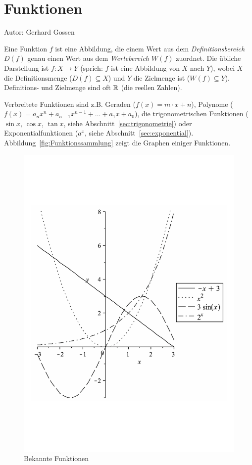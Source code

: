 \newcommand{\pitwo}{\frac{\pi}{2}}
\newcommand{\newpar}{\vspace{1em}\noindent}

\chapter{Funktionen}
\label{chap:funktionen}

Autor: Gerhard Gossen

\mbox{}\par
\noindent Eine Funktion $f$ ist eine Abbildung, die einem Wert aus dem \emph{Definitionsbereich $D(f)$} genau einen Wert aus dem \emph{Wertebereich $W(f)$} zuordnet. Die übliche Darstellung ist
$f : X \to Y$ (sprich: $f$ ist eine Abbildung von $X$ nach $Y$), wobei $X$ die Definitionsmenge ($D(f) \subseteq X$) und $Y$ die Zielmenge ist ($W(f) \subseteq Y$). Definitions- und Zielmenge sind oft $\mathbb{R}$ (die reellen Zahlen).

\noindent Verbreitete Funktionen sind z.B. Geraden ($f(x) = m\cdot x +n$), Polynome ($f(x) = a_n x^n + a_{n-1} x^{n-1}+\dots + a_1x+a_0$), die trigonometrischen Funktionen ($\sin x$, $\cos x$, $\tan x$, siehe Abschnitt~\ref{sec:trigonometrie}) oder Exponentialfunktionen ($a^x$, siehe Abschnitt~\ref{sec:exponential}). Abbildung~\ref{fig:Funktionssammlung} zeigt die Graphen einiger Funktionen.

\begin{figure}[bth]
\begin{center}
\includegraphics[width=.4\textwidth]{img/Funktionssammlung.pdf}
\end{center}
\caption{Bekannte Funktionen}
\label{fig:funktionen}
\end{figure} 

